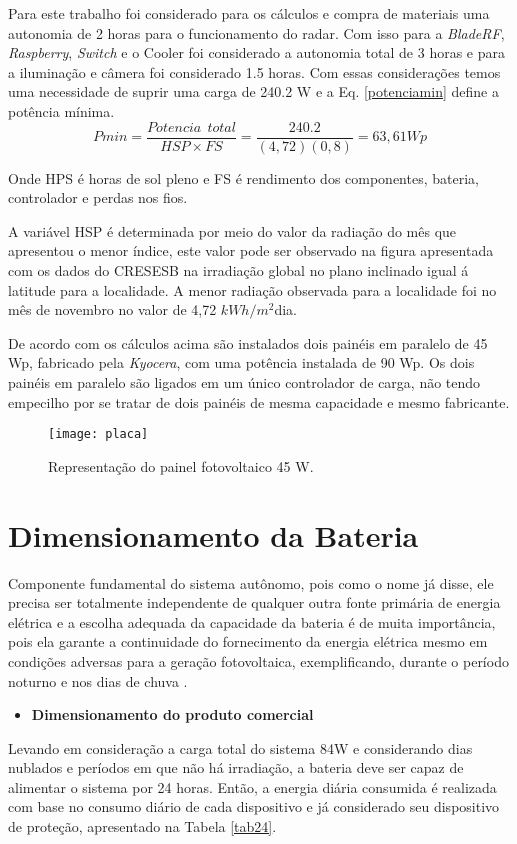 Para este trabalho foi considerado para os cálculos e compra de materiais uma autonomia de 2 horas para o funcionamento do radar. Com isso para a  \textit{BladeRF}, \textit{Raspberry}, \textit{Switch} e o Cooler foi considerado a autonomia total de 3 horas e para a iluminação e câmera foi considerado 1.5 horas. Com essas considerações temos uma necessidade de suprir uma carga de 240.2 W e a Eq. \ref{potenciamin} define a potência mínima.
\begin{equation}
    Pmin = \frac{Potencia\ \ total}{HSP \times FS} =\frac{240.2}{(4,72)(0,8)} = 63,61 Wp
    \label{potenciamin}
\end{equation}

Onde HPS é horas de sol pleno e FS é rendimento dos componentes, bateria, controlador e perdas nos fios.

A variável HSP é determinada por meio do valor da radiação do mês que apresentou o menor índice, este valor pode ser observado na figura apresentada com os dados do CRESESB \cite{solar} na irradiação global no plano inclinado igual á latitude para a localidade. A menor radiação observada para a localidade foi no mês de novembro no valor de 4,72 $kWh/m^2$dia. 
 
De acordo com os cálculos acima são instalados dois painéis em paralelo de 45 Wp, fabricado pela \textit{Kyocera}, com uma potência instalada de 90 Wp. Os dois painéis em paralelo são ligados em um único controlador de carga, não tendo empecilho  por se tratar de dois painéis de mesma capacidade e mesmo fabricante. 


\begin{figure}[H]
\centering
\texttt{[image: placa]}
\caption{Representação do painel fotovoltaico 45 W.}
\end{figure}

\section{Dimensionamento da Bateria}

Componente fundamental do sistema autônomo, pois como o nome já disse, ele precisa ser totalmente independente de qualquer outra fonte primária de energia elétrica e a escolha adequada da capacidade da bateria é de muita importância, pois ela garante a continuidade do fornecimento da energia elétrica mesmo em condições adversas para a geração fotovoltaica, exemplificando, durante o período noturno e nos dias de chuva \cite{alan}.
\begin{itemize}

 \item\textbf{Dimensionamento do produto comercial}
\end{itemize}
Levando em consideração a carga total do sistema 84W e considerando dias nublados e períodos em que não há irradiação, a bateria deve ser capaz de alimentar o sistema por 24 horas.
Então, a energia diária consumida é realizada com base no consumo diário de cada dispositivo e já considerado seu dispositivo de proteção, apresentado na Tabela \ref{tab24}.

